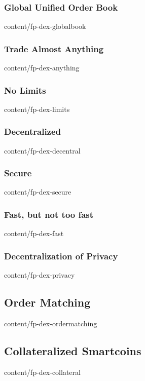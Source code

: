 \documentclass{btswhitepaper}
\begin{document}
\subsubsection  { Global Unified Order Book                        }  { content/fp-dex-globalbook      } 
\subsubsection  { Trade Almost Anything                            }  { content/fp-dex-anything        } 
\subsubsection  { No Limits                                        }  { content/fp-dex-limits          } 
\subsubsection  { Decentralized                                    }  { content/fp-dex-decentral       } 
\subsubsection  { Secure                                           }  { content/fp-dex-secure          } 
\subsubsection  { Fast, but not too fast                           }  { content/fp-dex-fast            } 
\subsubsection  { Decentralization of Privacy                      }  { content/fp-dex-privacy         } 
\subsection     { Order Matching                                   }  { content/fp-dex-ordermatching   } 
\subsection     { Collateralized Smartcoins                        }  { content/fp-dex-collateral      } 
\end{document}
